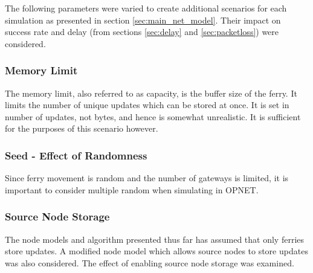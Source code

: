 The following parameters were varied to create additional scenarios for each simulation as presented in section \ref{sec:main_net_model}. 
Their impact on success rate and delay (from sections \ref{sec:delay} and \ref{sec:packetloss}) were considered.
  
\subsubsection{Memory Limit}
\label{sec:mainMemLimit}
The memory limit, also referred to as capacity, is the buffer size of the ferry.
It limits the number of unique updates which can be stored at once.
It is set in number of updates, not bytes, and hence is somewhat unrealistic.
It is sufficient for the purposes of this scenario however.

\subsubsection{Seed - Effect of Randomness}
Since ferry movement is random and the number of gateways is limited, it is important to consider multiple random when simulating in OPNET. 


\subsubsection{Source Node Storage}
\label{sec:source_node_storage}
The node models and algorithm presented thus far has assumed that only ferries store updates. 
A modified node model which allows source nodes to store updates was also considered.
The effect of enabling source node storage was examined.


